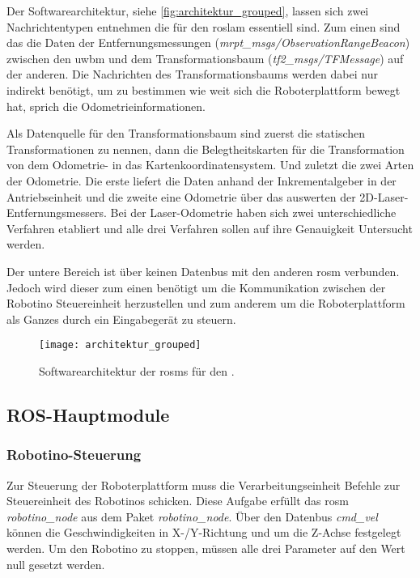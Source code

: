 Der Softwarearchitektur, siehe \autoref{fig:architektur_grouped}, lassen sich zwei Nachrichtentypen entnehmen die für den \gls{roslam} essentiell sind. Zum einen sind das die Daten der Entfernungsmessungen (\textit{mrpt\_msgs/ObservationRangeBeacon}) zwischen den \gls{uwbm} und dem Transformationsbaum (\textit{tf2\_msgs/TFMessage}) auf der anderen. Die Nachrichten des Transformationsbaums werden dabei nur indirekt benötigt, um zu bestimmen wie weit sich die Roboterplattform bewegt hat, sprich die Odometrieinformationen.

Als Datenquelle für den Transformationsbaum sind zuerst die statischen Transformationen zu nennen, dann die Belegtheitskarten für die Transformation von dem Odometrie- in das Kartenkoordinatensystem. Und zuletzt die zwei Arten der Odometrie. Die erste liefert die Daten anhand der Inkrementalgeber in der Antriebseinheit und die zweite eine Odometrie über das auswerten der 2D-Laser-Entfernungsmessers. Bei der Laser-Odometrie haben sich zwei unterschiedliche Verfahren etabliert und alle drei Verfahren sollen auf ihre Genauigkeit Untersucht werden.

Der untere Bereich ist über keinen Datenbus mit den anderen \gls{rosm} verbunden. Jedoch wird dieser zum einen benötigt um die Kommunikation zwischen der Robotino Steuereinheit herzustellen und zum anderem um die Roboterplattform als Ganzes durch ein Eingabegerät zu steuern.

\begin{figure}
	\centering
	\texttt{[image: architektur\_grouped]}
	\caption{Softwarearchitektur der \glspl{rosm} für den .}
	\label{fig:architektur_grouped}
\end{figure}


%
%
%
\subsection{ROS-Hauptmodule}


%
%
\subsubsection{Robotino-Steuerung}

Zur Steuerung der Roboterplattform muss die Verarbeitungseinheit Befehle zur Steuereinheit des Robotinos schicken. Diese Aufgabe erfüllt das \Gls{rosm} \textit{robotino\_node} aus dem Paket \textit{robotino\_node}. Über den Datenbus \textit{cmd\_vel} können die Geschwindigkeiten in X-/Y-Richtung und um die Z-Achse festgelegt werden. Um den Robotino zu stoppen, müssen alle drei Parameter auf den Wert null gesetzt werden.

